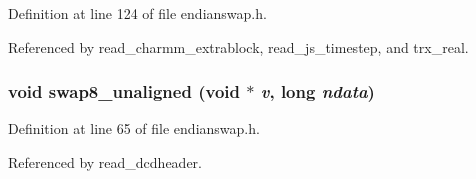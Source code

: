 Definition at line 124 of file endianswap.h.

Referenced by read\_\-charmm\_\-extrablock, read\_\-js\_\-timestep, and trx\_\-real.
\subsubsection{\setlength{\rightskip}{0pt plus 5cm}void swap8\_\-unaligned (void $\ast$ {\em v}, long {\em ndata})\hspace{0.3cm}{\tt  [static]}}\label{endianswap_8h_a2}




Definition at line 65 of file endianswap.h.

Referenced by read\_\-dcdheader.